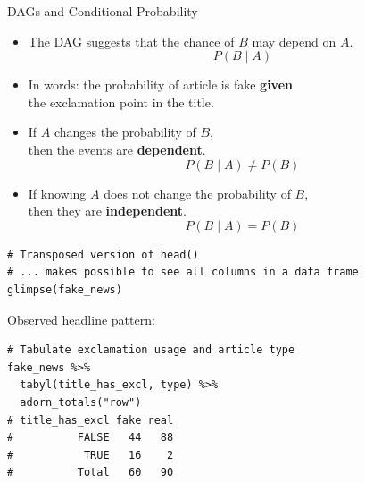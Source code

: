 \documentclass[12pt]{beamer}
\begin{document}
\begin{frame}{}
\begin{block}{DAGs and Conditional Probability}
\begin{itemize}
    \item The DAG suggests that the chance of \(B\) may depend on \(A\).
    \[
    P(B \mid A)
    \]
    \item[] In words: the probability of article is fake \textbf{given}\\
            \hspace{4cm}the exclamation point in the title.
    \pause
    \item If \(A\) changes the probability of \(B\),\\
          \hspace{2cm}then the events are \textbf{dependent}.
    \[
    P(B \mid A) \neq P(B)
    \]
    \item \pause If knowing \(A\) does not change the probability of \(B\),\\
          \hspace{5cm}then they are \textbf{independent}.
    \[
    P(B \mid A) = P(B)
    \]
\end{itemize}
\end{block}
\end{frame}

\begin{frame}[fragile]{}
\begin{verbatim}
# Transposed version of head()
# ... makes possible to see all columns in a data frame
glimpse(fake_news)
\end{verbatim}

\vspace{1.em}

Observed headline pattern:

\begin{verbatim}
# Tabulate exclamation usage and article type
fake_news %>% 
  tabyl(title_has_excl, type) %>% 
  adorn_totals("row")
# title_has_excl fake real
#          FALSE   44   88
#           TRUE   16    2
#          Total   60   90
\end{verbatim}
\end{frame}
\end{document}
